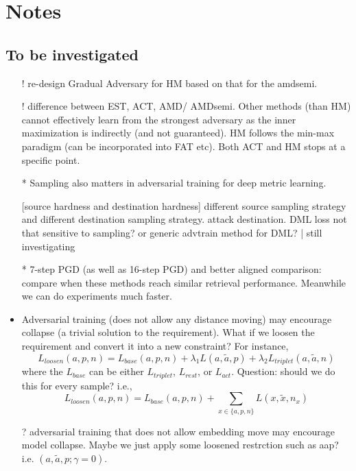 \newpage
\appendix

\section{Notes}

\subsection{To be investigated}

\begin{itemize}

	\item [!] re-design Gradual Adversary for HM based on that for the amdsemi.
	
	\item [!] difference between EST, ACT, AMD/ AMDsemi.
		Other methods (than HM) cannot effectively learn from the strongest
		adversary as the inner maximization is indirectly (and not guaranteed).
		HM follows the min-max paradigm (can be incorporated into FAT etc).
		Both ACT and HM stops at a specific point.
	
	\item [*] Sampling also matters in adversarial training for deep metric learning.

		[source hardness and destination hardness] different source sampling
		strategy and different destination sampling strategy. attack
		destination. DML loss not that sensitive to sampling? or generic
		advtrain method for DML? | still investigating

	\item [*] 7-step PGD (as well as 16-step PGD) and better aligned comparison:
		compare when these methods reach similar retrieval performance.
		Meanwhile we can do experiments much faster.

	\item Adversarial training (does not allow any distance moving) may
		encourage collapse (a trivial solution to the requirement). What if we
		loosen the requirement and convert it into a new constraint? For
		instance, \[
			L_{loosen}(a,p,n)=L_{base}(a,p,n)+\lambda_{1}L(a,\tilde{a},p)+\lambda_{2}L_{triplet}(a,\tilde{a},n)
		\] where the $L_{base}$ can be either $L_{triplet}$, $L_{rest}$, or
		$L_{act}$. Question: should we do this for every sample? i.e., \[
			L_{loosen}(a,p,n)=L_{base}(a,p,n)+\sum_{x\in\{a,p,n\}}L(x,\tilde{x},n_{x})
		\]

	\item [?] adversarial training that does not allow embedding move may
		encourage model collapse. Maybe we just apply some loosened restrction
		such as aap? i.e. $(a,\tilde{a},p;\gamma=0)$.


\end{itemize}
